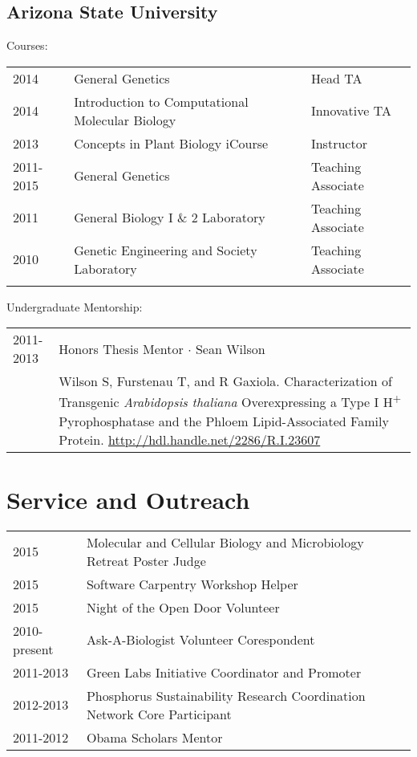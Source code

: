 \documentclass[11pt]{article}
\begin{document}
\subsection*{Arizona State University}
Courses:\\
\begin{tabularx}{\linewidth}{llX}
2014&General Genetics& Head TA\\
2014& Introduction to Computational Molecular Biology& Innovative TA\\
2013&Concepts in Plant Biology iCourse& Instructor\\
2011-2015&General Genetics&Teaching Associate\\
2011&General Biology I \& 2 Laboratory& Teaching Associate\\
2010&Genetic Engineering and Society Laboratory&Teaching Associate\\\\
\end{tabularx}
Undergraduate Mentorship:\\
\begin{tabularx}{\linewidth}{lX}
2011-2013&Honors Thesis Mentor $\cdotp$ Sean Wilson\\
&Wilson S, Furstenau T, and R Gaxiola. Characterization of Transgenic \textit{Arabidopsis thaliana} Overexpressing a Type I H\textsuperscript{+} Pyrophosphatase and the Phloem Lipid-Associated Family Protein. \href{http://hdl.handle.net/2286/R.I.23607}{http://hdl.handle.net/2286/R.I.23607}\\
\end{tabularx}

\section*{Service and Outreach}
\begin{tabularx}{\linewidth}{lX}
2015 &Molecular and Cellular Biology and Microbiology Retreat Poster Judge\\
2015 &Software Carpentry Workshop Helper\\
2015 &Night of the Open Door Volunteer\\
2010-present &Ask-A-Biologist Volunteer Corespondent\\
2011-2013&Green Labs Initiative Coordinator and Promoter\\
2012-2013&Phosphorus Sustainability Research Coordination Network Core Participant\\
2011-2012&Obama Scholars Mentor\\
\end{tabularx}
\end{document}
